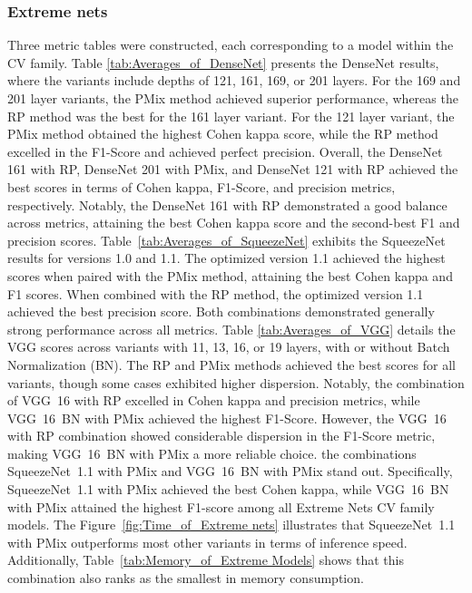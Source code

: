 




\FloatBarrier

\subsubsection{Extreme nets}

Three metric tables were constructed, each corresponding to a model within the \gls{CV} family.
Table \ref{tab:Averages_of_DenseNet} presents the DenseNet results, where the variants include depths of 121, 161, 169, or 201 layers. For the 169 and 201 layer variants, the \gls{PMix} method achieved superior performance, whereas the \gls{RP} method was the best for the 161 layer variant. For the 121 layer variant, the \gls{PMix} method obtained the highest Cohen kappa score, while the \gls{RP} method excelled in the F1-Score and achieved perfect precision. Overall, the DenseNet 161 with \gls{RP}, DenseNet 201 with \gls{PMix}, and DenseNet 121 with \gls{RP} achieved the best scores in terms of Cohen kappa, F1-Score, and precision metrics, respectively. Notably, the DenseNet 161 with \gls{RP} demonstrated a good balance across metrics, attaining the best Cohen kappa score and the second-best F1 and precision scores.
Table~\ref{tab:Averages_of_SqueezeNet} exhibits the SqueezeNet results for versions 1.0 and 1.1. The optimized version 1.1 achieved the highest scores when paired with the \gls{PMix} method, attaining the best Cohen kappa and F1 scores. When combined with the \gls{RP} method, the optimized version 1.1 achieved the best precision score. Both combinations demonstrated generally strong performance across all metrics.
Table \ref{tab:Averages_of_VGG} details the VGG scores across variants with 11, 13, 16, or 19 layers, with or without Batch Normalization (BN). The \gls{RP} and \gls{PMix} methods achieved the best scores for all variants, though some cases exhibited higher dispersion. Notably, the combination of \mbox{VGG 16} with \gls{RP} excelled in Cohen kappa and precision metrics, while \mbox{VGG 16 BN} with \gls{PMix} achieved the highest F1-Score. However, the \mbox{VGG 16} with \gls{RP} combination showed considerable dispersion in the F1-Score metric, making \mbox{VGG 16 BN} with \gls{PMix} a more reliable choice.
the combinations \mbox{SqueezeNet 1.1} with \gls{PMix} and \mbox{VGG 16 BN} with \gls{PMix} stand out. Specifically, \mbox{SqueezeNet 1.1} with \gls{PMix} achieved the best Cohen kappa, while \mbox{VGG 16 BN} with \gls{PMix} attained the highest F1-score among all Extreme Nets \gls{CV} family models. The Figure~\ref{fig:Time_of_Extreme nets} illustrates that \mbox{SqueezeNet 1.1} with \gls{PMix} outperforms most other variants in terms of inference speed. Additionally, Table~\ref{tab:Memory_of_Extreme Models} shows that this combination also ranks as the smallest in memory consumption.  
